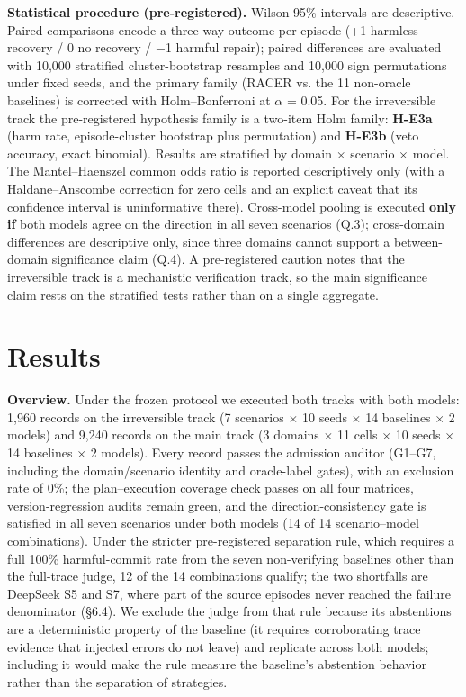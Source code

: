 \documentclass[10pt]{article}
\begin{document}
\textbf{Statistical procedure (pre-registered).} Wilson 95\% intervals are descriptive. Paired comparisons encode a three-way outcome per episode (+1 harmless recovery / 0 no recovery / $-$1 harmful repair); paired differences are evaluated with 10,000 stratified cluster-bootstrap resamples and 10,000 sign permutations under fixed seeds, and the primary family (RACER vs. the 11 non-oracle baselines) is corrected with Holm--Bonferroni at $\alpha$ = 0.05. For the irreversible track the pre-registered hypothesis family is a two-item Holm family: \textbf{H-E3a} (harm rate, episode-cluster bootstrap plus permutation) and \textbf{H-E3b} (veto accuracy, exact binomial). Results are stratified by domain $\times$ scenario $\times$ model. The Mantel--Haenszel common odds ratio is reported descriptively only (with a Haldane--Anscombe correction for zero cells and an explicit caveat that its confidence interval is uninformative there). Cross-model pooling is executed \textbf{only if} both models agree on the direction in all seven scenarios (Q.3); cross-domain differences are descriptive only, since three domains cannot support a between-domain significance claim (Q.4). A pre-registered caution notes that the irreversible track is a mechanistic verification track, so the main significance claim rests on the stratified tests rather than on a single aggregate.

\section{Results}

\textbf{Overview.} Under the frozen protocol we executed both tracks with both models: 1,960 records on the irreversible track (7 scenarios $\times$ 10 seeds $\times$ 14 baselines $\times$ 2 models) and 9,240 records on the main track (3 domains $\times$ 11 cells $\times$ 10 seeds $\times$ 14 baselines $\times$ 2 models). Every record passes the admission auditor (G1--G7, including the domain/scenario identity and oracle-label gates), with an exclusion rate of 0\%; the plan--execution coverage check passes on all four matrices, version-regression audits remain green, and the direction-consistency gate is satisfied in all seven scenarios under both models (14 of 14 scenario--model combinations). Under the stricter pre-registered separation rule, which requires a full 100\% harmful-commit rate from the seven non-verifying baselines other than the full-trace judge, 12 of the 14 combinations qualify; the two shortfalls are DeepSeek S5 and S7, where part of the source episodes never reached the failure denominator (\S6.4). We exclude the judge from that rule because its abstentions are a deterministic property of the baseline (it requires corroborating trace evidence that injected errors do not leave) and replicate across both models; including it would make the rule measure the baseline's abstention behavior rather than the separation of strategies.
\end{document}
